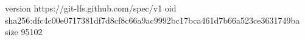 version https://git-lfs.github.com/spec/v1
oid sha256:dfc4c00e0717381df7d8cf8c66a9ac9992bc17bca461d7b66a523ce3631749ba
size 95102
